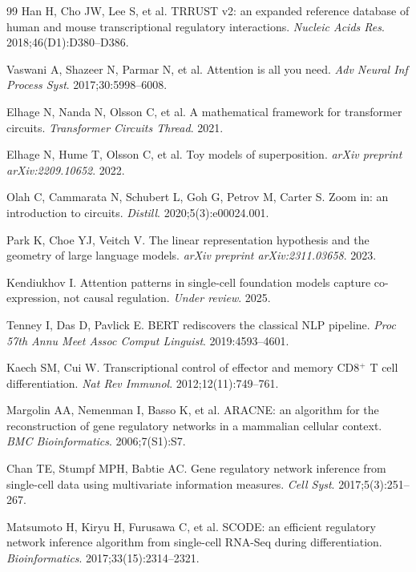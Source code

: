 \documentclass[11pt]{article}
\begin{document}
\begin{thebibliography}{99}
Han H, Cho JW, Lee S, et al.
TRRUST v2: an expanded reference database of human and mouse transcriptional regulatory interactions.
\textit{Nucleic Acids Res}. 2018;46(D1):D380--D386.

Vaswani A, Shazeer N, Parmar N, et al.
Attention is all you need.
\textit{Adv Neural Inf Process Syst}. 2017;30:5998--6008.

Elhage N, Nanda N, Olsson C, et al.
A mathematical framework for transformer circuits.
\textit{Transformer Circuits Thread}. 2021.

Elhage N, Hume T, Olsson C, et al.
Toy models of superposition.
\textit{arXiv preprint arXiv:2209.10652}. 2022.

Olah C, Cammarata N, Schubert L, Goh G, Petrov M, Carter S.
Zoom in: an introduction to circuits.
\textit{Distill}. 2020;5(3):e00024.001.

Park K, Choe YJ, Veitch V.
The linear representation hypothesis and the geometry of large language models.
\textit{arXiv preprint arXiv:2311.03658}. 2023.

Kendiukhov I.
Attention patterns in single-cell foundation models capture co-expression, not causal regulation.
\textit{Under review}. 2025.

Tenney I, Das D, Pavlick E.
BERT rediscovers the classical NLP pipeline.
\textit{Proc 57th Annu Meet Assoc Comput Linguist}. 2019:4593--4601.

Kaech SM, Cui W.
Transcriptional control of effector and memory CD8$^+$ T cell differentiation.
\textit{Nat Rev Immunol}. 2012;12(11):749--761.

Margolin AA, Nemenman I, Basso K, et al.
ARACNE: an algorithm for the reconstruction of gene regulatory networks in a mammalian cellular context.
\textit{BMC Bioinformatics}. 2006;7(S1):S7.

Chan TE, Stumpf MPH, Babtie AC.
Gene regulatory network inference from single-cell data using multivariate information measures.
\textit{Cell Syst}. 2017;5(3):251--267.

Matsumoto H, Kiryu H, Furusawa C, et al.
SCODE: an efficient regulatory network inference algorithm from single-cell RNA-Seq during differentiation.
\textit{Bioinformatics}. 2017;33(15):2314--2321.


\end{thebibliography}
\end{document}
